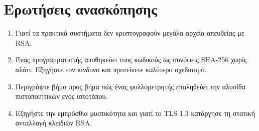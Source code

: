 \section*{Ερωτήσεις ανασκόπησης}
\begin{enumerate}
  \item Γιατί τα πρακτικά συστήματα δεν κρυπτογραφούν μεγάλα αρχεία απευθείας με RSA;
  \item Ένας προγραμματιστής αποθηκεύει τους κωδικούς ως συνόψεις SHA-256 χωρίς αλάτι. Εξηγήστε τον κίνδυνο και προτείνετε καλύτερο σχεδιασμό.
  \item Περιγράψτε βήμα προς βήμα πώς ένας φυλλομετρητής επαληθεύει την αλυσίδα πιστοποιητικών ενός ιστοτόπου.
  \item Εξηγήστε την εμπρόσθια μυστικότητα και γιατί το TLS 1.3 κατάργησε τη στατική ανταλλαγή κλειδιών RSA.
\end{enumerate}
